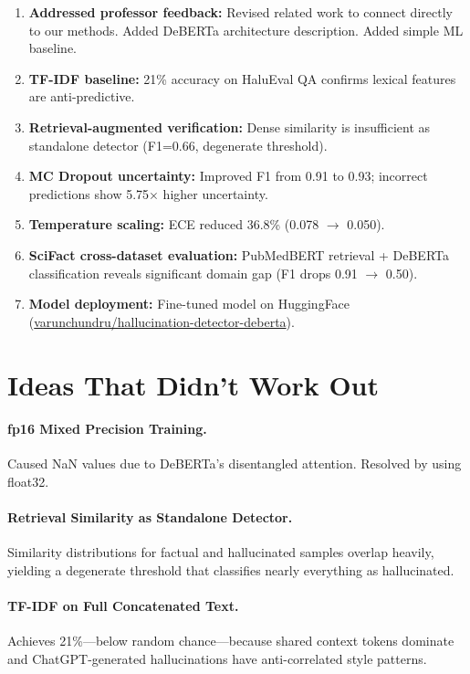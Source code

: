 \documentclass[11pt]{article}
\begin{document}
\begin{enumerate}
    \item \textbf{Addressed professor feedback:} Revised related work to connect directly to our methods. Added DeBERTa architecture description. Added simple ML baseline.
    \item \textbf{TF-IDF baseline:} 21\% accuracy on HaluEval QA confirms lexical features are anti-predictive.
    \item \textbf{Retrieval-augmented verification:} Dense similarity is insufficient as standalone detector (F1=0.66, degenerate threshold).
    \item \textbf{MC Dropout uncertainty:} Improved F1 from 0.91 to 0.93; incorrect predictions show 5.75$\times$ higher uncertainty.
    \item \textbf{Temperature scaling:} ECE reduced 36.8\% (0.078 $\rightarrow$ 0.050).
    \item \textbf{SciFact cross-dataset evaluation:} PubMedBERT retrieval + DeBERTa classification reveals significant domain gap (F1 drops 0.91 $\rightarrow$ 0.50).
    \item \textbf{Model deployment:} Fine-tuned model on HuggingFace (\url{varunchundru/hallucination-detector-deberta}).
\end{enumerate}

\section{Ideas That Didn't Work Out}

\paragraph{fp16 Mixed Precision Training.} Caused NaN values due to DeBERTa's disentangled attention. Resolved by using float32.

\paragraph{Retrieval Similarity as Standalone Detector.} Similarity distributions for factual and hallucinated samples overlap heavily, yielding a degenerate threshold that classifies nearly everything as hallucinated.

\paragraph{TF-IDF on Full Concatenated Text.} Achieves 21\%---below random chance---because shared context tokens dominate and ChatGPT-generated hallucinations have anti-correlated style patterns.
\end{document}
